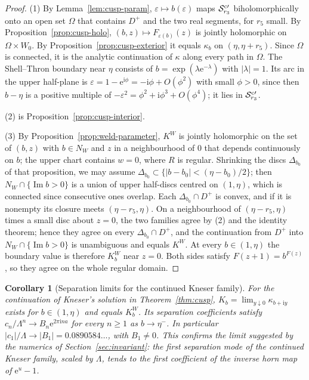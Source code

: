 \documentclass[11pt]{amsart}
\newtheorem{corollary}[theorem]{Corollary}
\theoremstyle{definition}
\newcommand{\Rr}{R}
\newcommand{\Kk}{K}
\newcommand{\eee}{\mathrm{e}}
\newcommand{\ii}{\mathrm{i}}
\begin{document}
\begin{proof}
(1) By Lemma~\ref{lem:cusp-param}, $\varepsilon\mapsto b(\varepsilon)$ maps $\mathcal S^{\rm c\prime}_{r_3}$
biholomorphically onto an open set $\Omega$ that contains $D^+$ and the two real
segments, for $r_5$ small.  By Proposition~\ref{prop:cusp-holo},
$(b,z)\mapsto F_{\varepsilon(b)}(z)$ is jointly holomorphic on $\Omega\times W_0$.  By
Proposition~\ref{prop:cusp-exterior} it equals $\kappa_b$ on $(\eta,\eta+r_5)$.  Since
$\Omega$ is connected, it is the analytic continuation of $\kappa$ along every path
in $\Omega$.  The Shell--Thron boundary near $\eta$ consists of
$b=\exp(\lambda\eee^{-\lambda})$ with $|\lambda|=1$.  Its arc in the upper half-plane is
$\varepsilon=1-\eee^{\ii\phi}=-\ii\phi+O(\phi^2)$ with small $\phi>0$, since then
$b-\eta$ is a positive multiple of $-\varepsilon^2=\phi^2+\ii\phi^3+O(\phi^4)$; it lies in
$\mathcal S^{\rm c\prime}_{r_3}$.

(2) is Proposition~\ref{prop:cusp-interior}.

(3) By Proposition~\ref{prop:weld-parameter}, $\Kk^W$ is jointly holomorphic on
the set of $(b,z)$ with $b\in N_W$ and $z$ in a neighbourhood of $0$ that
depends continuously on $b$; the upper chart contains $w=0$, where $\Rr$ is
regular.  Shrinking the discs $\Delta_{b_0}$ of that proposition, we may assume
$\Delta_{b_0}\subset\{|b-b_0|<(\eta-b_0)/2\}$; then $N_W\cap\{\operatorname{Im}b>0\}$ is a union
of upper half-discs centred on $(1,\eta)$, which is connected since
consecutive ones overlap.  Each $\Delta_{b_0}\cap D^+$ is convex, and if it is
nonempty its closure meets $(\eta-r_5,\eta)$.  On a neighbourhood of
$(\eta-r_5,\eta)$ times a small disc about $z=0$, the two families agree by (2)
and the identity theorem; hence they agree on every $\Delta_{b_0}\cap D^+$, and the
continuation from $D^+$ into $N_W\cap\{\operatorname{Im}b>0\}$ is unambiguous and equals
$\Kk^W$.  At every $b\in(1,\eta)$ the boundary value is therefore $\Kk^W_b$ near
$z=0$.  Both sides satisfy
$F(z+1)=b^{F(z)}$, so they agree on the whole regular domain.
\end{proof}

\begin{corollary}[Separation limits for the continued Kneser family]\label{cor:conjecture}
For the continuation of Kneser's solution in Theorem~\ref{thm:cusp},
$\Kk_b=\lim_{y\downarrow0}\kappa_{b+\ii y}$ exists for $b\in(1,\eta)$ and equals $\Kk^W_b$.  Its
separation coefficients satisfy $c_n/\Lambda^n\to B_n\eee^{2\pi\ii na}$ for every $n\ge1$
as $b\to\eta^-$.  In particular $|c_1|/\Lambda\to|B_1|=0.0890584\ldots$, with $B_1\ne0$.
This confirms the limit suggested by the numerics of Section~\ref{sec:invariant}:
the first separation mode of the continued Kneser family, scaled by $\Lambda$,
tends to the first coefficient of the inverse horn map of $\eee^u-1$.
\end{corollary}
\end{document}

